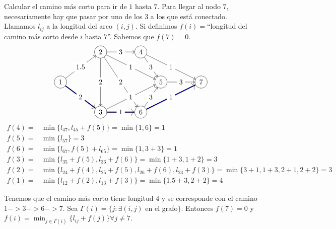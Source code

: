 \documentclass[MIOP.tex]{subfiles}
\begin{document}
\begin{ej} Calcular el camino más corto para ir de $1$ hasta $7$. Para llegar al nodo $7$, necesariamente hay que pasar por uno de los $3$ a los que está conectado. Llamamos $l_{ij}$ a la longitud del arco $(i,j)$. Si definimos $f(i)=$``longitud del camino más corto desde $i$ hasta $7$''. Sabemos que $f(7)=0$. 
\[
\begin{tikzpicture}
    \node[shape=circle,draw=black] (A) at (0,1.5) {$1$};
    \node[shape=circle,draw=black] (C) at (2,0) {$3$};    
    \node[shape=circle,draw=black] (B) at (2,3) {$2$};
    \node[shape=circle,draw=black] (D) at (4,3) {$4$};
    \node[shape=circle,draw=black] (E) at (4,0) {$6$};
    \node[shape=circle,draw=black] (F) at (5,1.5) {$5$};
    \node[shape=circle,draw=black] (G) at (7,1.5) {$7$};
\tikzset{mystyle/.style={->,double=blue}} 
\tikzset{every node/.style={fill=white}} 
     \path [->] (A) edge node {$1.5$} (B);
     \path [->] (A) edge [mystyle]  node {$2$} (C);
     \path [->] (B) edge node {$2$} (C);
     \path [->] (B) edge node {$1$} (F);
     \path [->] (B) edge node {$2$} (E);
     \path [->] (B) edge node {$3$} (D);
     \path [->] (C) edge [mystyle]  node {$1$} (E);
     \path [->] (C) edge node {$1$} (F);
     \path [->] (D) edge node {$3$} (F);
     \path [->] (D) edge node {$1$} (G);
     \path [->] (E) edge [mystyle] node {$1$} (G);
     \path [->] (F) edge node {$3$} (G);
	 \path [->] (E) edge node {$3$} (F);
\end{tikzpicture}
\]
\begin{align*}
f(4)=&\min\{l_{47},l_{45}+f(5)\}=\min\{1,6\}=1\\
f(5)=&\min\{l_{57}\}=3\\
f(6)=&\min\{l_{67},f(5)+l_{65}\}=\min\{1,3+3\}=1\\
f(3)=&\min\{l_{35}+f(5),l_{36}+f(6)\}=\min\{1+3,1+2\}=3\\
f(2)=&\min\{l_{24}+f(4),l_{25}+f(5),l_{26}+f(6),l_{23}+f(3)\}=\min\{3+1,1+3,2+1,2+2\}=3\\
f(1)=&\min\{l_{12}+f(2),l_{13}+f(3)\}=\min\{1.5+3,2+2\}=4
\end{align*}

Tenemos que el camino más corto tiene longitud $4$ y se corresponde con el camino $1->3->6->7$. Sea $\Gamma(i)=\{j:\exists (i,j)$ en el grafo$\}$. Entonces $f(7)=0$ y $f(i)=\min_{j\in\Gamma(i)}\{l_{ij}+f(j)\}\forall j\neq 7$.

\end{ej}
\end{document}
